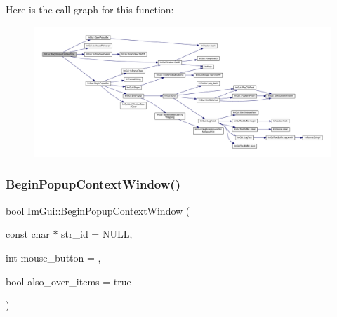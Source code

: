 Here is the call graph for this function\+:
\nopagebreak
\begin{figure}[H]
\begin{center}
\leavevmode
\includegraphics[width=350pt]{namespace_im_gui_a87a2228929503fff067d2e167a690751_cgraph}
\end{center}
\end{figure}
\mbox{\label{namespace_im_gui_acf98c99f041ea341d0328e071c56411b}} 
\subsubsection{\texorpdfstring{Begin\+Popup\+Context\+Window()}{BeginPopupContextWindow()}}
{\footnotesize\ttfamily bool Im\+Gui\+::\+Begin\+Popup\+Context\+Window (\begin{DoxyParamCaption}\item[{const char $\ast$}]{str\+\_\+id = {\ttfamily NULL},  }\item[{int}]{mouse\+\_\+button = {},  }\item[{bool}]{also\+\_\+over\+\_\+items = {\ttfamily true} }\end{DoxyParamCaption})}

